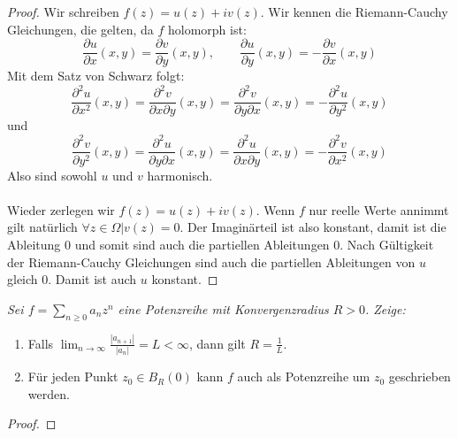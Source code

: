 \documentclass[11pt]{article}
\newenvironment{problem}[2][Beispiel]{
    \begin{trivlist}
        \item[\hskip \labelsep {\bfseries #1}\hskip \labelsep {\bfseries #2.}] \itshape}{
    \end{trivlist}\normalshape
}
\begin{document}
    \begin{proof}
        Wir schreiben $f(z) = u(z)+iv(z)$. Wir kennen die Riemann-Cauchy Gleichungen, die gelten, da
        $f$ holomorph ist:
        $$\dfrac{\partial u}{\partial x}(x,y) = \dfrac{\partial v}{\partial y}(x,y), \qquad
        \dfrac{\partial u}{\partial y}(x,y) = -\dfrac{\partial v}{\partial x}(x,y)$$
        Mit dem Satz von Schwarz folgt:
        $$\dfrac{\partial^2 u}{\partial x^2}(x,y)=\dfrac{\partial^2 v}{\partial x\partial y}(x,y)
        = \dfrac{\partial^2 v}{\partial y\partial x}(x,y) = -\dfrac{\partial^2 u}{\partial y^2}(x,y)$$
        und
        $$\dfrac{\partial^2 v}{\partial y^2}(x,y)=\dfrac{\partial^2 u}{\partial y\partial x}(x,y)
        = \dfrac{\partial^2 u}{\partial x\partial y}(x,y) = -\dfrac{\partial^2 v}{\partial x^2}(x,y)$$
        Also sind sowohl $u$ und $v$ harmonisch.\\\\
        Wieder zerlegen wir $f(z) = u(z)+iv(z)$. Wenn $f$ nur reelle Werte annimmt gilt natürlich
        $\forall z\in\Omega| v(z) = 0$. Der Imaginärteil ist also konstant, damit ist die Ableitung
        $0$ und somit sind auch die partiellen Ableitungen $0$. Nach Gültigkeit der Riemann-Cauchy
        Gleichungen sind auch die partiellen Ableitungen von $u$ gleich $0$. Damit ist auch $u$ konstant.
    \end{proof}

    \begin{problem}{5}
        Sei $f=\sum_{n\geq 0}a_n z^n$ eine Potenzreihe mit Konvergenzradius
        $R>0$. Zeige:
        \begin{enumerate}[label=(\alph*)]
            \item Falls $\lim_{n\to\infty}\frac{|a_{n+1}|}{|a_n|}=L<\infty$,
            dann gilt $R=\frac{1}{L}$.
            \item Für jeden Punkt $z_0\in B_R(0)$ kann $f$ auch als Potenzreihe um
            $z_0$ geschrieben werden.
        \end{enumerate}
    \end{problem}

    \begin{proof}

    \end{proof}
\end{document}
